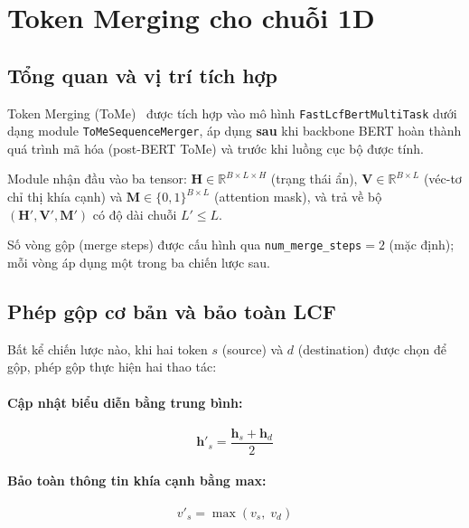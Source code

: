 \section{Token Merging cho chuỗi 1D}
\label{sec:pp_tome}

\subsection{Tổng quan và vị trí tích hợp}
\label{subsec:tome_overview}

Token Merging (ToMe)~\cite{bolya2023tome} được tích hợp vào mô hình
\texttt{FastLcfBertMultiTask} dưới dạng module
\texttt{ToMeSequenceMerger}, áp dụng \textbf{sau} khi backbone BERT
hoàn thành quá trình mã hóa (post-BERT ToMe) và trước khi luồng cục bộ
được tính.

Module nhận đầu vào ba tensor:
$\mathbf{H} \in \mathbb{R}^{B \times L \times H}$ (trạng thái ẩn),
$\mathbf{V} \in \mathbb{R}^{B \times L}$ (véc-tơ chỉ thị khía cạnh)
và $\mathbf{M} \in \{0,1\}^{B \times L}$ (attention mask),
và trả về bộ $(\mathbf{H}', \mathbf{V}', \mathbf{M}')$ có độ dài
chuỗi $L' \leq L$.

Số vòng gộp (merge steps) được cấu hình qua
\texttt{num\_merge\_steps}$= 2$ (mặc định); mỗi vòng áp dụng một
trong ba chiến lược sau.

\subsection{Phép gộp cơ bản và bảo toàn LCF}
\label{subsec:merge_op}

Bất kể chiến lược nào, khi hai token $s$ (source) và $d$ (destination)
được chọn để gộp, phép gộp thực hiện hai thao tác:

\paragraph{Cập nhật biểu diễn bằng trung bình:}
\begin{equation}
  \mathbf{h}'_s = \frac{\mathbf{h}_s + \mathbf{h}_d}{2}
  \label{eq:merge_avg}
\end{equation}

\paragraph{Bảo toàn thông tin khía cạnh bằng max:}
\begin{equation}
  v'_s = \max(v_s,\; v_d)
  \label{eq:merge_lcf}
\end{equation}

